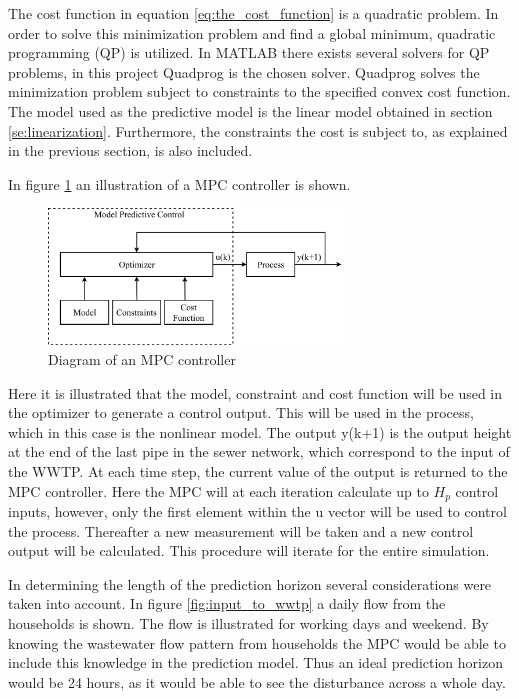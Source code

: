 The cost function in equation \ref{eq:the_cost_function} is a quadratic problem. In order to solve this minimization problem and find a global minimum, quadratic programming (QP) is utilized. In MATLAB there exists several solvers for QP problems, in this project Quadprog is the chosen solver. Quadprog solves the minimization problem subject to constraints to the specified convex cost function. The model used as the predictive model is the linear model obtained in section \ref{se:linearization}. Furthermore, the constraints the cost is subject to, as explained in the previous section, is also included. 

In figure \ref{fig:mpc_diagram} an illustration of a MPC controller is shown.
\begin{figure}[H]
	\centering
	\includegraphics[width=0.70\textwidth]{report/control/pictures/mpc_diagram}
	\caption{Diagram of an MPC controller}
	\label{fig:mpc_diagram}
\end{figure}

Here it is illustrated that the model, constraint and cost function will be used in the optimizer to generate a control output. This will be used in the process, which in this case is the nonlinear model. The output y(k+1) is the output height at the end of the last pipe in the sewer network, which correspond to the input of the WWTP. At each time step, the current value of the output is returned to the MPC controller. Here the MPC will at each iteration calculate up to $H_p$ control inputs, however, only the first element within the u vector will be used to control the process. Thereafter a new measurement will be taken and a new control output will be calculated. This procedure will iterate for the entire simulation.

In determining the length of the prediction horizon several considerations were taken into account. In figure \ref{fig:input_to_wwtp} a daily flow from the households is shown. The flow is illustrated for working days and weekend. By knowing the wastewater flow pattern from households the MPC would be able to include this knowledge in the prediction model. Thus an ideal prediction horizon would be 24 hours, as it would be able to see the disturbance across a whole day. 


